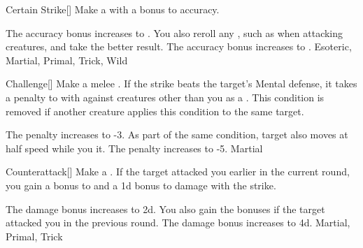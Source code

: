 \lowercase{\hypertarget{maneuver:Certain Strike}{}}\label{maneuver:Certain Strike}
\hypertarget{maneuver:Certain Strike}{}
\begin{freeability}{Certain Strike}[]
Make a  with a  bonus to accuracy.

\rankline
{} The accuracy bonus increases to .
 You also reroll any , such as when attacking  creatures, and take the better result.
 The accuracy bonus increases to .
 Esoteric, Martial, Primal, Trick, Wild
\end{freeability}
\vspace{0.25em}



\lowercase{\hypertarget{maneuver:Challenge}{}}\label{maneuver:Challenge}
\hypertarget{maneuver:Challenge}{}
\begin{freeability}{Challenge}[]
Make a melee .
If the strike beats the target's Mental defense, it takes a  penalty to  with  against creatures other than you as a .
This condition is removed if another creature applies this condition to the same target.

\rankline
{} The penalty increases to -3.
 As part of the same condition, target also moves at half speed while you  it.
 The penalty increases to -5.
 Martial
\end{freeability}
\vspace{0.25em}



\lowercase{\hypertarget{maneuver:Counterattack}{}}\label{maneuver:Counterattack}
\hypertarget{maneuver:Counterattack}{}
\begin{freeability}{Counterattack}[]
Make a .
If the target attacked you earlier in the current round, you gain a  bonus to  and a \plus1d bonus to damage with the strike.

\rankline
{} The damage bonus increases to \plus2d.
 You also gain the bonuses if the target attacked you in the previous round.
 The damage bonus increases to \plus4d.
 Martial, Primal, Trick
\end{freeability}
\vspace{0.25em}



